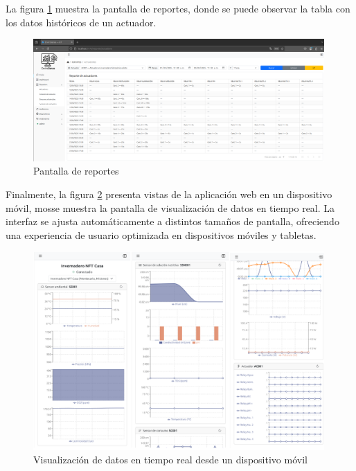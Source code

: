 La figura \ref{fig:reportes_tabla_actuadores} muestra la pantalla de reportes,
donde se puede observar la tabla con los datos históricos de un actuador.

\begin{figure}[H]
    \centering
    \includegraphics[width=0.99\textwidth]{./Images/28_reportes_3.png}
    \caption{Pantalla de reportes}
    \label{fig:reportes_tabla_actuadores}
\end{figure}

Finalmente, la figura \ref{fig:dashboar_celular} presenta vistas de la
aplicación web en un dispositivo móvil, mosse muestra la pantalla de
visualización de datos en tiempo real. La interfaz se ajusta automáticamente a
distintos tamaños de pantalla, ofreciendo una experiencia de usuario optimizada
en dispositivos móviles y tabletas.

\begin{figure}[H]
    \centering
    \includegraphics[width=0.99\textwidth]{./Images/29_dashboard_celular.png}
    \caption{Visualización de datos en tiempo real desde un dispositivo móvil}
    \label{fig:dashboar_celular}
\end{figure}

